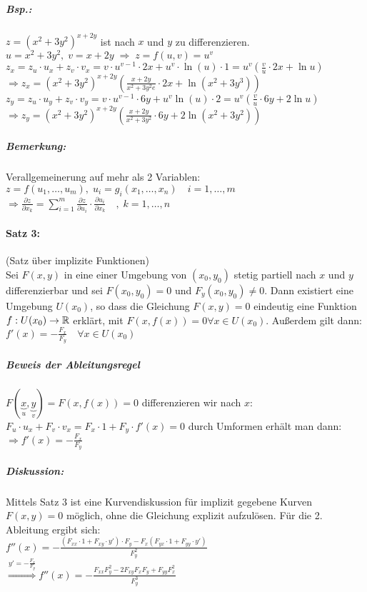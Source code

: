 \subparagraph{Bsp.:} $z=(x^2+3y^2)^{x+2y}$ ist nach $x$ und $y$ zu differenzieren.\\
$u=x^2+3y^2, \; v=x+2y \;\Rightarrow\; z=f(u,v)=u^v$\\
$z_x=z_u\cdot u_x + z_v \cdot v_x = v \cdot u ^{v-1} \cdot 2x + u^v \cdot \ln (u) \cdot 1=u^v\left(\frac{v}{u}\cdot 2x + \ln u \right)$\\
$\Rightarrow z_x = (x^2+3y^2)^{x+2y} \left( \frac{x+2y}{x^2+3y^2e}\cdot 2x + \ln \left(x^2+3y^3\right)\right)$\\
$z_y=z_u \cdot u_y + z_v \cdot v_y = v\cdot u^{v-1} \cdot 6y + u^v \ln (u) \cdot 2 = u^v\left(\frac{v}{u}\cdot 6y+2\ln u\right)$\\
$\Rightarrow z_y = (x^2+3y^2)^{x+2y}\left(\frac{x+2y}{x^2+3y^2}\cdot 6y+2\ln\left(x^2+3y^2\right)\right)$
\subparagraph{Bemerkung:} Verallgemeinerung auf mehr als 2 Variablen:\\
$z=f(u_1,\dots, u_m), \; u_i = g_i(x_1, \dots , x_n) \quad i=1,\dots,m$\\
$\Rightarrow\frac{\partial z}{\partial x_k}=\sum_{i=1}^m\frac{\partial z}{\partial u_i}\cdot \frac{\partial u_i}{\partial x_k} \quad , \; k=1,\dots, n$

\paragraph{Satz 3:} (Satz über implizite Funktionen)\\
Sei $F(x,y)$ in eine einer Umgebung von $(x_0, y_0)$ stetig partiell nach $x$ und $y$ differenzierbar und sei $F(x_0,y_0)=0$ und $F_y(x_0,y_0)\not = 0$. Dann existiert eine Umgebung $U(x_0)$, so dass die Gleichung $F(x,y)=0$ eindeutig eine Funktion $f: U(x_0) \to \mathbb{R}$ erklärt, mit $F(x,f(x)) = 0 \forall x \in U(x_0)$. Außerdem gilt dann:\\
$\boxed{f'(x)=-\frac{F_x}{F_y}} \quad \forall x \in U(x_0)$

\subparagraph{Beweis der Ableitungsregel} \parskp
$F(\underbrace{x}_u, \underbrace{y}_v)=F(x,f(x))=0$ differenzieren wir nach $x$:\\
$F_u\cdot u_x + F_v \cdot v_x=F_x\cdot 1 + F_y \cdot f'(x) = 0$ durch Umformen erhält man dann:\\
$\Rightarrow f'(x) = -\frac{F_x}{F_y}$

\subparagraph{Diskussion:} Mittels Satz 3 ist eine Kurvendiskussion für implizit gegebene Kurven $F(x,y)=0$ möglich, ohne die Gleichung explizit aufzulösen. Für die 2. Ableitung ergibt sich:\\
$f''(x) = -\frac{(F_{xx} \cdot 1 + F_{xy} \cdot y')\cdot F_y - F_x (F_{yx}\cdot 1 + F_{yy} \cdot y')}{F_y^2}$\\
$\overset{y'=-\frac{F_x}{F_y}}{\Longrightarrow} \boxed{f''(x)=-\frac{F_{xx}F_y^2-2F_{xy}F_xF_y+F_{yy}F_x^2}{F_y^3}}$

